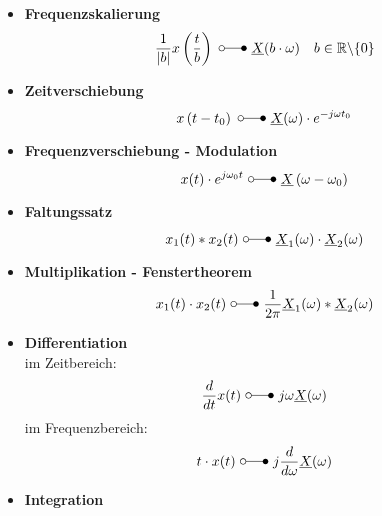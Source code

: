 \begin{mdframed}[style=exercise]
    \begin{itemize}
		\item \textbf{Frequenzskalierung}
		      \[
			      \frac{1}{|b|} x\left(\frac{t}{b}\right)\ \laplace\ \underline{X}(b\cdot\omega) \quad b \in \mathbb{R} \backslash\{0\}
		      \]
		\item \textbf{Zeitverschiebung}
		      \[
			      x\left(t-t_{0}\right)\ \laplace\ \underline{X}(\omega) \cdot e^{-j \omega t_{0}}
		      \]
		\item \textbf{Frequenzverschiebung - Modulation}
		      \[
			      x(t) \cdot e^{j \omega_{0} t}\ \laplace\ \underline{X}\left(\omega-\omega_{0}\right)
		      \]
		\item \textbf{Faltungssatz}
		      \[
			      x_{1}(t) * x_{2}(t)\ \laplace\ \underline{X}_{1}(\omega) \cdot \underline{X}_{2}(\omega)
		      \]
		\item \textbf{Multiplikation - Fenstertheorem}
		      \[
			      x_{1}(t) \cdot x_{2}(t)\ \laplace\ \frac{1}{2 \pi} \underline{X}_{1}(\omega) * \underline{X}_{2}(\omega)
		      \]
		\item \textbf{Differentiation\\}
		      {\small im Zeitbereich:}
		      \[
			      \frac{d}{dt} x(t) \ \laplace\ j\omega\underline{X}(\omega)
		      \]
		      {\small im Frequenzbereich:}
		      \[
			      t \cdot x(t)\ \laplace\ j \frac{d}{d \omega} \underline{X}(\omega)
		      \]
		\item \textbf{Integration}

\end{itemize}
\end{mdframed}
